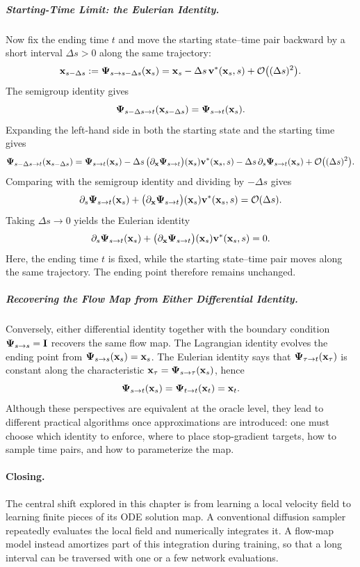 \subparagraph{Starting-Time Limit: the Eulerian Identity.} Now fix the ending time $t$ and move the starting state--time pair
backward by a short interval $\Delta s>0$ along the same trajectory:
\[
    {\mathbf{x}}_{s-\Delta s}
    :=
    {\bm{\Psi}}_{s\to s-\Delta s}({\mathbf{x}}_s)
    =
    {\mathbf{x}}_s-\Delta s\,{\mathbf{v}}^*({\mathbf{x}}_s,s)
    +\mathcal{O}\big((\Delta s)^2\big).
\]
The semigroup identity gives
\[
    {\bm{\Psi}}_{s-\Delta s\to t}({\mathbf{x}}_{s-\Delta s})
    =
    {\bm{\Psi}}_{s\to t}({\mathbf{x}}_s).
\]
Expanding the left-hand side in both the starting state and the starting time gives
\[
    {\bm{\Psi}}_{s-\Delta s\to t}({\mathbf{x}}_{s-\Delta s})
    =
    {\bm{\Psi}}_{s\to t}({\mathbf{x}}_s)
    -
    \Delta s\,
    \big(\partial_{{\mathbf{x}}}{\bm{\Psi}}_{s\to t}\big)({\mathbf{x}}_s){\mathbf{v}}^*({\mathbf{x}}_s,s)
    -
    \Delta s\,
    \partial_s{\bm{\Psi}}_{s\to t}({\mathbf{x}}_s)
    +
    \mathcal{O}\big((\Delta s)^2\big).
\]
Comparing with the semigroup identity and dividing by $-\Delta s$ gives
\[
    \partial_s{\bm{\Psi}}_{s\to t}({\mathbf{x}}_s)
    +
    \big(\partial_{{\mathbf{x}}}{\bm{\Psi}}_{s\to t}\big)({\mathbf{x}}_s){\mathbf{v}}^*({\mathbf{x}}_s,s)
    =
    \mathcal{O}(\Delta s).
\]
Taking $\Delta s\to0$ yields the Eulerian identity
\[
    \partial_s{\bm{\Psi}}_{s\to t}({\mathbf{x}}_s)
    +
    \big(\partial_{{\mathbf{x}}}{\bm{\Psi}}_{s\to t}\big)({\mathbf{x}}_s){\mathbf{v}}^*({\mathbf{x}}_s,s)
    =
    0.
\]
Here, the ending time $t$ is fixed, while the starting state--time pair
moves along the same trajectory. The ending point therefore remains
unchanged.

\subparagraph{Recovering the Flow Map from Either Differential Identity.}
Conversely, either differential identity
together with the boundary condition ${\bm{\Psi}}_{s\to s}={\mathbf{I}}$ recovers the same
flow map.  The Lagrangian identity evolves the ending point from
${\bm{\Psi}}_{s\to s}({\mathbf{x}}_s)={\mathbf{x}}_s$.  The Eulerian identity says that
${\bm{\Psi}}_{\tau\to t}({\mathbf{x}}_\tau)$ is constant along the characteristic
${\mathbf{x}}_\tau={\bm{\Psi}}_{s\to \tau}({\mathbf{x}}_s)$, hence
\[
    {\bm{\Psi}}_{s\to t}({\mathbf{x}}_s)
    =
    {\bm{\Psi}}_{t\to t}({\mathbf{x}}_t)
    =
    {\mathbf{x}}_t.
\]
Although these perspectives are equivalent at the oracle level, they lead to
different practical algorithms once approximations are introduced: one must
choose which identity to enforce, where to place stop-gradient targets, how to
sample time pairs, and how to parameterize the map.


\paragraph{Closing.}
The central shift explored in this chapter is from learning a local velocity
field to learning finite pieces of its ODE solution map. A conventional
diffusion sampler repeatedly evaluates the local field and numerically
integrates it. A flow-map model instead amortizes part of this integration
during training, so that a long interval can be traversed with one or a few
network evaluations.

